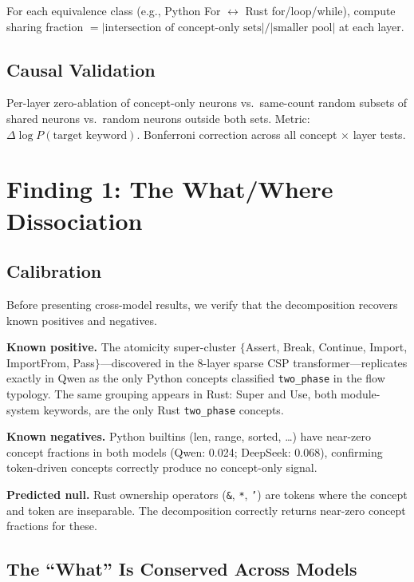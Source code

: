 \documentclass[11pt]{article}
\begin{document}
For each equivalence class (e.g., Python For $\leftrightarrow$ Rust for/loop/while), compute sharing fraction $= |\text{intersection of concept-only sets}| / |\text{smaller pool}|$ at each layer.

\subsection{Causal Validation}

Per-layer zero-ablation of concept-only neurons vs.\ same-count random subsets of shared neurons vs.\ random neurons outside both sets. Metric: $\Delta \log P(\text{target keyword})$. Bonferroni correction across all concept $\times$ layer tests.

\section{Finding 1: The What/Where Dissociation}

\subsection{Calibration}

Before presenting cross-model results, we verify that the decomposition recovers known positives and negatives.

\textbf{Known positive.} The atomicity super-cluster $\{$Assert, Break, Continue, Import, ImportFrom, Pass$\}$---discovered in the 8-layer sparse CSP transformer---replicates exactly in Qwen as the only Python concepts classified \texttt{two\_phase} in the flow typology. The same grouping appears in Rust: Super and Use, both module-system keywords, are the only Rust \texttt{two\_phase} concepts.

\textbf{Known negatives.} Python builtins (len, range, sorted, \ldots) have near-zero concept fractions in both models (Qwen: 0.024; DeepSeek: 0.068), confirming token-driven concepts correctly produce no concept-only signal.

\textbf{Predicted null.} Rust ownership operators (\texttt{\&}, \texttt{*}, \texttt{'}) are tokens where the concept and token are inseparable. The decomposition correctly returns near-zero concept fractions for these.

\subsection{The ``What'' Is Conserved Across Models}
\end{document}
